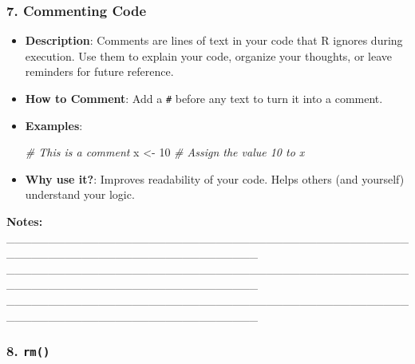 \documentclass[
  11pt,
]{article}
\newenvironment{Shaded}{\begin{snugshade}}{\end{snugshade}}
\newcommand{\CommentTok}[1]{\textcolor[rgb]{0.56,0.35,0.01}{\textit{#1}}}
\newcommand{\DecValTok}[1]{\textcolor[rgb]{0.00,0.00,0.81}{#1}}
\newcommand{\NormalTok}[1]{#1}
\newcommand{\OtherTok}[1]{\textcolor[rgb]{0.56,0.35,0.01}{#1}}
\begin{document}
\subsubsection{7. Commenting Code}\label{commenting-code}

\begin{itemize}
\item
  \textbf{Description}: Comments are lines of text in your code that R
  ignores during execution. Use them to explain your code, organize your
  thoughts, or leave reminders for future reference.
\item
  \textbf{How to Comment}: Add a \texttt{\#} before any text to turn it
  into a comment.
\item
  \textbf{Examples}:

\begin{Shaded}
\begin{Highlighting}[]
\CommentTok{\# This is a comment}
\NormalTok{x }\OtherTok{\textless{}{-}} \DecValTok{10} \CommentTok{\# Assign the value 10 to x}
\end{Highlighting}
\end{Shaded}
\item
  \textbf{Why use it?}: Improves readability of your code. Helps others
  (and yourself) understand your logic.
\end{itemize}

\textbf{Notes:}
\_\_\_\_\_\_\_\_\_\_\_\_\_\_\_\_\_\_\_\_\_\_\_\_\_\_\_\_\_\_\_\_\_\_\_\_\_\_\_\_\_\_\_\_\_\_\_\_\_\_\_\_\_\_\_\_\_\_\_\_\_\_\_\_\_\_\_\_\_\_\_\_\_\_\_\_\_\_
\_\_\_\_\_\_\_\_\_\_\_\_\_\_\_\_\_\_\_\_\_\_\_\_\_\_\_\_\_\_\_\_\_\_\_\_\_\_\_\_\_\_\_\_\_\_\_\_\_\_\_\_\_\_\_\_\_\_\_\_\_\_\_\_\_\_\_\_\_\_\_\_\_\_\_\_\_\_
\_\_\_\_\_\_\_\_\_\_\_\_\_\_\_\_\_\_\_\_\_\_\_\_\_\_\_\_\_\_\_\_\_\_\_\_\_\_\_\_\_\_\_\_\_\_\_\_\_\_\_\_\_\_\_\_\_\_\_\_\_\_\_\_\_\_\_\_\_\_\_\_\_\_\_\_\_\_

\subsubsection{\texorpdfstring{8. \texttt{rm()}}{8. rm()}}\label{rm}
\end{document}
